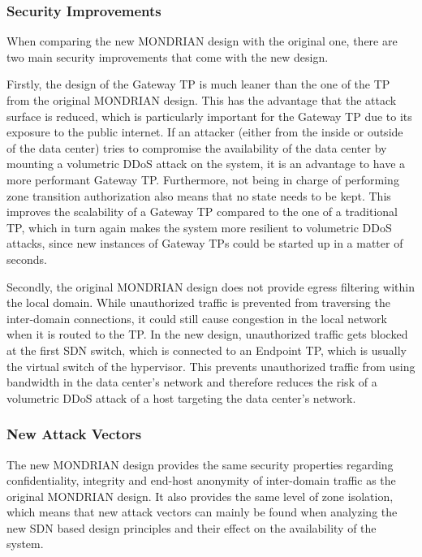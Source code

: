 \subsubsection{Security Improvements}\label{Security Improvements}
When comparing the new MONDRIAN design with the original one, there are two main security improvements that come with the new design. 

Firstly, the design of the Gateway \acs{TP} is much leaner than the one of the \acs{TP} from the original MONDRIAN design. This has the advantage that the attack surface is reduced, which is particularly important for the Gateway \acs{TP} due to its exposure to the public internet. If an attacker (either from the inside or outside of the data center) tries to compromise the availability of the data center by mounting a volumetric \acs{DDoS} attack on the system, it is an advantage to have a more performant Gateway \acs{TP}. Furthermore, not being in charge of performing zone transition authorization also means that no state needs to be kept. This improves the scalability of a Gateway \acs{TP} compared to the one of a traditional \acs{TP}, which in turn again makes the system more resilient to volumetric \acs{DDoS} attacks, since new instances of Gateway \acsp{TP} could be started up in a matter of seconds.

Secondly, the original MONDRIAN design does not provide egress filtering within the local domain. While unauthorized traffic is prevented from traversing the inter-domain connections, it could still cause congestion in the local network when it is routed to the \acs{TP}. In the new design, unauthorized traffic gets blocked at the first \acs{SDN} switch, which is connected to an Endpoint \acs{TP}, which is usually the virtual switch of the hypervisor. This prevents unauthorized traffic from using bandwidth in the data center's network and therefore reduces the risk of a volumetric DDoS attack of a host targeting the data center's network.

\subsubsection{New Attack Vectors}\label{New Attack Vectors}
The new MONDRIAN design provides the same security properties regarding confidentiality, integrity and end-host anonymity of inter-domain traffic as the original MONDRIAN design. It also provides the same level of zone isolation, which means that new attack vectors can mainly be found when analyzing the new \acs{SDN} based design principles and their effect on the availability of the system. 

